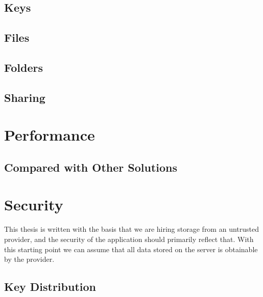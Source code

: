 \documentclass[pdftex,english,10pt,b5paper,twoside]{book}
\begin{document}
\subsection{Keys}
\subsection{Files}

\subsection{Folders}

\subsection{Sharing}

\section{Performance}

\subsection{Compared with Other Solutions}

\section{Security}
This thesis is written with the basis that we are hiring storage from an
untrusted provider, and the security of the application should primarily
reflect that. With this starting point we can assume that all data stored on
the server is obtainable by the provider.

\subsection{Key Distribution}
\label{sec:DI:keydist}
\end{document}
